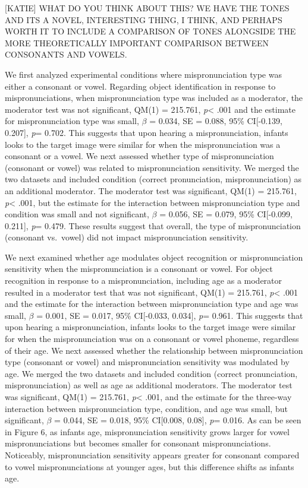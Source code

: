 \documentclass[man]{apa6}
\theoremstyle{definition}
\theoremstyle{definition}
\theoremstyle{definition}
\theoremstyle{remark}
\begin{document}
{[}KATIE{]} WHAT DO YOU THINK ABOUT THIS? WE HAVE THE TONES AND ITS A
NOVEL, INTERESTING THING, I THINK, AND PERHAPS WORTH IT TO INCLUDE A
COMPARISON OF TONES ALONGSIDE THE MORE THEORETICALLY IMPORTANT
COMPARISON BETWEEN CONSONANTS AND VOWELS.

We first analyzed experimental conditions where mispronunciation type
was either a consonant or vowel. Regarding object identification in
response to mispronunciations, when mispronunciation type was included
as a moderator, the moderator test was not significant, QM(1) = 215.761,
\emph{p}\textless{} .001 and the estimate for mispronunciation type was
small, \(\beta\) = 0.034, SE = 0.088, 95\% CI{[}-0.139, 0.207{]},
\emph{p}= 0.702. This suggests that upon hearing a mispronunciation,
infants looks to the target image were similar for when the
mispronunciation was a consonant or a vowel. We next assessed whether
type of mispronunciation (consonant or vowel) was related to
mispronunciation sensitivity. We merged the two datasets and included
condition (correct pronunciation, mispronunciation) as an additional
moderator. The moderator test was significant, QM(1) = 215.761,
\emph{p}\textless{} .001, but the estimate for the interaction between
mispronunciation type and condition was small and not significant,
\(\beta\) = 0.056, SE = 0.079, 95\% CI{[}-0.099, 0.211{]}, \emph{p}=
0.479. These results suggest that overall, the type of mispronunciation
(consonant vs.~vowel) did not impact mispronunciation sensitivity.

We next examined whether age modulates object recognition or
mispronunciation sensitivity when the mispronunciation is a consonant or
vowel. For object recognition in response to a mispronunciation,
including age as a moderator resulted in a moderator test that was not
significant, QM(1) = 215.761, \emph{p}\textless{} .001 and the estimate
for the interaction between mispronunciation type and age was small,
\(\beta\) = 0.001, SE = 0.017, 95\% CI{[}-0.033, 0.034{]}, \emph{p}=
0.961. This suggests that upon hearing a mispronunciation, infants looks
to the target image were similar for when the mispronunciation was on a
consonant or vowel phoneme, regardless of their age. We next assessed
whether the relationship between mispronunciation type (consonant or
vowel) and mispronunciation sensitivity was modulated by age. We merged
the two datasets and included condition (correct pronunciation,
mispronunciation) as well as age as additional moderators. The moderator
test was significant, QM(1) = 215.761, \emph{p}\textless{} .001, and the
estimate for the three-way interaction between mispronunciation type,
condition, and age was small, but significant, \(\beta\) = 0.044, SE =
0.018, 95\% CI{[}0.008, 0.08{]}, \emph{p}= 0.016. As can be seen in
Figure 6, as infants age, mispronunciation sensitivity grows larger for
vowel mispronunciations but becomes smaller for consonant
mispronunciations. Noticeably, mispronunciation sensitivity appears
greater for consonant compared to vowel mispronunciations at younger
ages, but this difference shifts as infants age.
\end{document}
